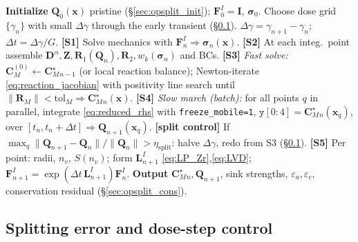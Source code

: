 \documentclass[11pt]{article}
\newcommand{\CM}{\mathbf{C}_{M}}
\newcommand{\Rone}{\mathbf{R}_{1}}
\newcommand{\Rtwo}{\mathbf{R}_{2}}
\newcommand{\sig}{\bm{\sigma}}
\newcommand{\eps}{\varepsilon}
\newcommand{\dt}{\Delta t}
\newcommand{\dg}{\Delta \gamma}
\newcommand{\code}[1]{\texttt{#1}}
\begin{document}
\begin{algorithm}[h!]
\caption{Operator-split QSSA march (steady mobile FEM $\oplus$ pointwise immobile CVODE)}
\begin{algorithmic}[1]
\State \textbf{Initialize} $\mathbf Q_0(\mathbf x)$ pristine (\S\ref{sec:opsplit_init}); $\mathbf F^I_0=\mathbf I$, $\sig_0$.
\State Choose dose grid $\{\gamma_n\}$ with small $\dg$ through the early transient (\S\ref{sec:opsplit_dt}).
    \State $\dg=\gamma_{n+1}-\gamma_n$;\; $\dt=\dg/G$.
    \State \textbf{[S1]} Solve mechanics with $\mathbf F^I_n\Rightarrow\sig_n(\mathbf x)$.
    \State \textbf{[S2]} At each integ.\ point assemble $\mathbf D^\alpha,\mathbf Z,\Rone(\mathbf Q_n),\Rtwo,w_k(\sig_n)$ and BCs.
    \State \textbf{[S3]} \emph{Fast solve:} $\CM^{(0)}\!\leftarrow\!\CM^\star_{n-1}$ (or local reaction balance);
    \Statex \hspace{2.2em} Newton-iterate \eqref{eq:reaction_jacobian} with positivity line search until $\|\mathbf R_M\|<\mathrm{tol}_M\Rightarrow\CM^\star_n(\mathbf x)$.
    \State \textbf{[S4]} \emph{Slow march (batch):} for all points $q$ in parallel, integrate \eqref{eq:reduced_rhs}
    \Statex \hspace{2.2em} with \code{freeze\_mobile=1}, $\texttt{y}[0\!:\!4]=\CM^\star_n(\mathbf x_q)$, over $[t_n,t_n+\dt]\Rightarrow\mathbf Q_{n+1}(\mathbf x_q)$.
    \State \textbf{[split control]} If $\max_q \|\mathbf Q_{n+1}-\mathbf Q_n\|/\|\mathbf Q_n\|>\eta_{\mathrm{split}}$: halve $\dg$, redo from S3 (\S\ref{sec:opsplit_dt}).
    \State \textbf{[S5]} Per point: radii, $n_v$, $S(n_v)$; form $\mathbf L^I_{n+1}$ \eqref{eq:LP_Zr},\eqref{eq:LVD}; $\mathbf F^I_{n+1}=\exp(\dt\,\mathbf L^I_{n+1})\mathbf F^I_n$.
    \State \textbf{Output} $\CM^\star_n,\mathbf Q_{n+1}$, sink strengths, $\eps_a,\eps_c$, conservation residual (\S\ref{sec:opsplit_cons}).
\EndFor
\end{algorithmic}
\end{algorithm}

\subsection{Splitting error and dose-step control}
\label{sec:opsplit_dt}
\end{document}
